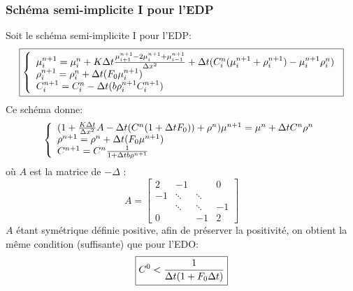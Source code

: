 \subsubsection{Schéma semi-implicite I pour l'EDP}
Soit le schéma semi-implicite I pour l'EDP:
\begin{equation} \boxed{\left\{
                \begin{array}{ll}
                   \mu^{n+1}_i = \mu^{n}_i+ K\Delta t \frac{\mu^{n+1}_{i+1}-2\mu^{n+1}_i+\mu^{n+1}_{i-1}}{\Delta x ^2} + \Delta t( C^{n}_i(\mu^{n+1}_i + \rho^{n+1}_i) -\mu^{n+1}_i\rho^{n}_i)\\
                \rho^{n+1}_i=  \rho^{n}_i+ \Delta t (F_0 \mu^{n+1}_i) \\
                 C^{n+1}_i =C^{n}_i- \Delta t(b\rho^{n+1}_iC^{n+1}_i)
                \end{array}
              \right.}
\end{equation}
Ce schéma donne:
\begin{equation*} \left\{
                \begin{array}{ll}
                   (1+\frac{K\Delta t}{\Delta x^2}A-\Delta t(C^{n}(1+\Delta t F_0)) + \rho^{n})\mu^{n+1} = \mu^{n}+  \Delta t C^{n}\rho^{n} \\
                \rho^{n+1}=  \rho^{n}+ \Delta t (F_0 \mu^{n+1}) \\
                 C^{n+1} = C^{n}\frac{1}{1+ \Delta t b\rho^{n+1}}
                \end{array}
              \right.
\end{equation*}
où $A$ est la matrice de $-\Delta$
:\begin{equation}  \label{myeq}A= \left[ \begin{matrix}2 & -1 & & 0\\-1 & \ddots & \ddots &  \\& \ddots & \ddots &  -1 \\0 &  & -1 & 2  \end{matrix}  \right]\end{equation}
$A$ étant symétrique définie positive, afin de préserver la positivité, on obtient la même condition (suffisante) que pour l'EDO:
\begin{equation}
	\boxed{C^0< \frac{1}{\Delta t(1+F_0\Delta t)}}
\end{equation}
